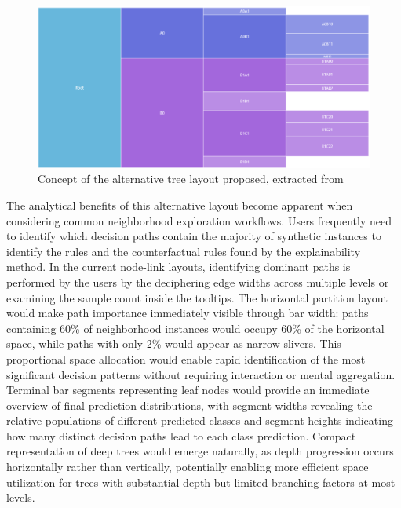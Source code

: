 \begin{figure}
    \centering
    \includegraphics[width=0.8\linewidth]{images/alternative Tree Layout.png}
    \caption{Concept of the alternative tree layout proposed, extracted from \cite{horizontalPartitionChart}}
    \label{fig:altTreeLayout}
\end{figure}

The analytical benefits of this alternative layout become apparent when considering common neighborhood exploration workflows. Users frequently need to identify which decision paths contain the majority of synthetic instances to identify the rules and the counterfactual rules found by the explainability method. In the current node-link layouts, identifying dominant paths is performed by the users by the 
deciphering edge widths across multiple levels or examining the sample count inside the tooltips. The horizontal partition layout would make path importance immediately visible through bar width: paths containing 60\% of neighborhood instances would occupy 60\% of the horizontal space, while paths with only 2\% would appear as narrow slivers. This proportional space allocation would enable rapid identification of the most significant decision patterns without requiring interaction or mental aggregation. Terminal bar segments representing leaf nodes would provide an immediate overview of final prediction distributions, with segment widths revealing the relative populations of different predicted classes and segment heights indicating how many distinct decision paths lead to each class prediction. Compact representation of deep trees would emerge naturally, as depth progression occurs horizontally rather than vertically, potentially enabling more efficient space utilization for trees with substantial depth but limited branching factors at most levels.

